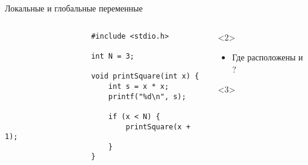 \documentclass[aspectratio=169,14pt]{beamer}
\begin{document}
    \begin{frame}[fragile]{Локальные и глобальные переменные}
        \begin{columns}
            \begin{column}{0.5\textwidth}
                \begin{lstlisting}
                    #include <stdio.h>

                    int N = 3;

                    void printSquare(int x) {
                        int s = x * x;
                        printf("%d\n", s);

                        if (x < N) {
                            printSquare(x + 1);
                        }
                    }
                \end{lstlisting}
            \end{column}
            \begin{column}{0.5\textwidth}
                \begin{onlyenv}<2>
                    \begin{itemize}
                        \item Где расположены  и ?
                    \end{itemize}
                \end{onlyenv}
                \begin{onlyenv}<3>
                    \begin{tikzpicture}[ scale=1 ]
                    \end{tikzpicture}
                \end{onlyenv}
            \end{column}
        \end{columns}
    \end{frame}

    \qnaframe
\end{document}
